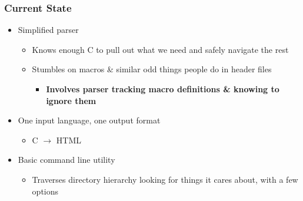 \documentclass[handout]{beamer}
\begin{document}
  \begin{frame}
    \frametitle{Current State}
    \begin{itemize}
      \item Simplified parser
        \begin{itemize}
          \item Knows enough C to pull out what we need and safely navigate the
            rest
          \item Stumbles on macros \& similar odd things people do in header
            files
            \begin{itemize}
              \item \textbf{Involves parser tracking macro definitions \&
                knowing to ignore them}
            \end{itemize}
        \end{itemize}
      \item One input language, one output format
        \begin{itemize}
          \item C $\rightarrow$ HTML
        \end{itemize}
      \item Basic command line utility
        \begin{itemize}
          \item Traverses directory hierarchy looking for things it cares about,
            with a few options
        \end{itemize}
    \end{itemize}
  \end{frame}
\end{document}
